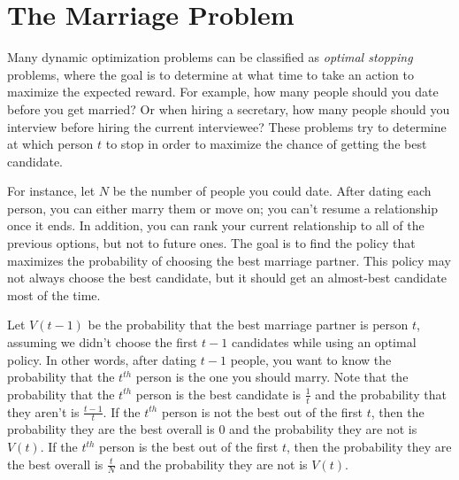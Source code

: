 \labdependencies{}

\section*{The Marriage Problem} %

Many dynamic optimization problems can be classified as \emph{optimal stopping} problems, where the goal is to determine at what time to take an action to maximize the expected reward.
For example, how many people should you date before you get married?
Or when hiring a secretary, how many people should you interview before hiring the current interviewee?
These problems try to determine at which person $t$ to stop in order to maximize the chance of getting the best candidate.

For instance, let $N$ be the number of people you could date.
After dating each person, you can either marry them or move on; you can't resume a relationship once it ends.
In addition, you can rank your current relationship to all of the previous options, but not to future ones.
The goal is to find the policy that maximizes the probability of choosing the best marriage partner.
This policy may not always choose the best candidate, but it should get an almost-best candidate most of the time.

Let $V(t-1)$ be the probability that the best marriage partner is person $t$, assuming we didn't choose the first $t-1$ candidates while using an optimal policy.
In other words, after dating $t-1$ people, you want to know the probability that the $t^{th}$ person is the one you should marry.
Note that the probability that the $t^{th}$ person is the best candidate is $\frac{1}{t}$ and the probability that they aren't is $\frac{t-1}{t}$.
If the $t^{th}$ person is not the best out of the first $t$, then the probability they are the best overall is 0 and the probability they are not is $V(t)$.
If the $t^{th}$ person is the best out of the first $t$, then the probability they are the best overall is $\frac{t}{N}$ and the probability they are not is $V(t)$.

